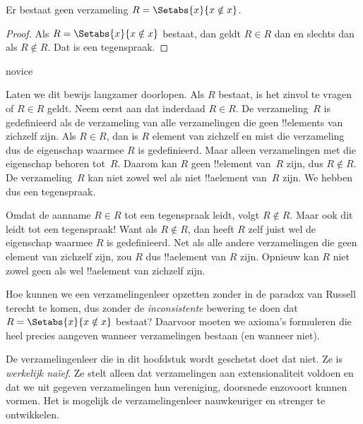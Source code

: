 \documentclass[openany]{memoir}
\begin{document}
\begin{thm}
	Er bestaat geen verzameling $R = \Setabs{x}{x \notin x}$.
\end{thm}

\begin{proof}
Als $R = \Setabs{x}{x \notin x}$ bestaat, dan geldt
$R \in R$ dan en slechts dan als $R \notin R$. Dat is een tegenspraak.
\end{proof}

\begin{tagblock}{novice}
\begin{explain}
Laten we dit bewijs langzamer doorlopen. Als $R$ bestaat, is het
zinvol te vragen of $R \in R$ geldt. Neem eerst aan dat inderdaad $R
\in R$. De verzameling~$R$ is gedefinieerd als de verzameling van alle
verzamelingen die geen !!{element}s van zichzelf zijn. Als $R \in R$,
dan is $R$ element van zichzelf en mist die verzameling dus de eigenschap
waarmee $R$ is gedefinieerd. Maar alleen verzamelingen met die eigenschap
behoren tot~$R$. Daarom kan $R$ geen !!{element} van~$R$ zijn, dus
$R \notin R$. De verzameling~$R$ kan niet zowel wel als niet
!!a{element} van~$R$ zijn. We hebben dus een tegenspraak.

Omdat de aanname $R \in R$ tot een tegenspraak leidt, volgt $R \notin
R$. Maar ook dit leidt tot een tegenspraak!{} Want als $R \notin R$,
dan heeft $R$ zelf juist wel de eigenschap waarmee $R$ is
gedefinieerd. Net als alle andere verzamelingen die geen element van
zichzelf zijn, zou $R$ dus !!a{element} van $R$ zijn. Opnieuw kan $R$
niet zowel geen als wel !!a{element} van zichzelf zijn.
\end{explain}
\end{tagblock}

\begin{digress}
Hoe kunnen we een verzamelingenleer opzetten zonder in de paradox van
Russell terecht te komen, dus zonder de \emph{inconsistente} bewering
te doen dat $R = \Setabs{x}{x \notin x}$ bestaat? Daarvoor moeten we
axioma's formuleren die heel precies aangeven wanneer verzamelingen
bestaan (en wanneer niet).
	
De verzamelingenleer die in dit hoofdstuk wordt geschetst doet dat
niet. Ze is \emph{werkelijk na\"ief}. Ze stelt alleen dat
verzamelingen aan extensionaliteit voldoen en dat we uit gegeven
verzamelingen hun vereniging, doorsnede enzovoort kunnen vormen. Het
is mogelijk de verzamelingenleer nauwkeuriger en strenger te ontwikkelen.
\end{digress}
\endgroup
\OLEndChapterHook
\end{document}
